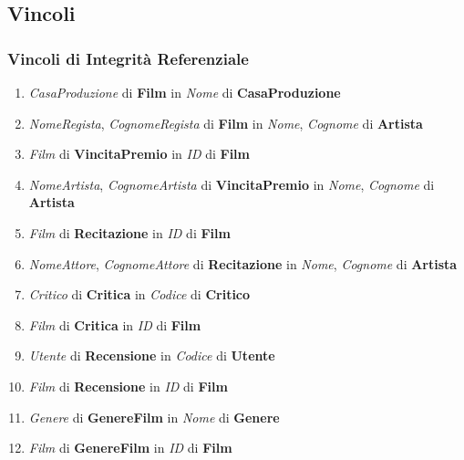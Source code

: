 \documentclass{article}
\begin{document}
\subsection{Vincoli}
\subsubsection{Vincoli di Integrità Referenziale}
\begin{enumerate}
\itemsep-0.25em %
    \item \textit{CasaProduzione} di \textbf{Film} in \textit{Nome} di \textbf{CasaProduzione}
    
    \item \textit{NomeRegista}, \textit{CognomeRegista} di \textbf{Film} in \textit{Nome}, \textit{Cognome} di \textbf{Artista}
    
    \item \textit{Film} di \textbf{VincitaPremio} in \textit{ID} di \textbf{Film}
    
    \item \textit{NomeArtista}, \textit{CognomeArtista} di \textbf{VincitaPremio} in \textit{Nome}, \textit{Cognome} di \textbf{Artista}
    
    \item \textit{Film} di \textbf{Recitazione} in \textit{ID} di \textbf{Film}
    
    \item \textit{NomeAttore}, \textit{CognomeAttore} di \textbf{Recitazione} in \textit{Nome}, \textit{Cognome} di \textbf{Artista}
    
    \item \textit{Critico} di \textbf{Critica} in \textit{Codice} di \textbf{Critico}
    
    \item \textit{Film} di \textbf{Critica} in \textit{ID} di \textbf{Film}
    
    \item \textit{Utente} di \textbf{Recensione} in \textit{Codice} di \textbf{Utente}
    
    \item \textit{Film} di \textbf{Recensione} in \textit{ID} di \textbf{Film}
    
    \item \textit{Genere} di \textbf{GenereFilm} in \textit{Nome} di \textbf{Genere}
    
    \item \textit{Film} di \textbf{GenereFilm} in \textit{ID} di \textbf{Film}
    

\end{enumerate}
\end{document}
